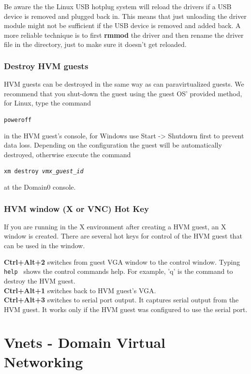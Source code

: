 \documentclass[11pt,twoside,final,openright]{report}
\begin{document}
\begin{description}
Be aware the the Linux USB
hotplug system will reload
the drivers if a USB device
is removed and plugged back
in.
This means that just unloading
the driver module might not
be sufficient if the USB device
is removed and added back.
A more reliable technique is
to first
\textbf{rmmod}
the driver and then rename the
driver file in the
directory,
just to make sure it doesn't get
reloaded.
\end{description}

\subsection{Destroy HVM guests}
HVM guests can be destroyed in the same way as can paravirtualized guests. We recommend that you shut-down the guest using the guest OS' provided method, for Linux, type the command

{\small {\tt poweroff}} 

in the HVM guest's console, for Windows use Start -> Shutdown first to prevent
data loss. Depending on the configuration the guest will be automatically
destroyed, otherwise execute the command 

{\small {\tt xm destroy \emph{vmx\_guest\_id} }} 

at the Domain0 console.

\subsection{HVM window (X or VNC) Hot Key}
If you are running in the X environment after creating a HVM guest, an X window is created. There are several hot keys for control of the HVM guest that can be used in the window.
 
{\bfseries Ctrl+Alt+2} switches from guest VGA window to the control window. Typing {\small {\tt help }} shows the control commands help. For example, 'q' is the command to destroy the HVM guest.\\
{\bfseries Ctrl+Alt+1} switches back to HVM guest's VGA.\\
{\bfseries Ctrl+Alt+3} switches to serial port output. It captures serial output from the HVM guest. It works only if the HVM guest was configured to use the serial port. \\

\chapter{Vnets - Domain Virtual Networking}
\end{document}
